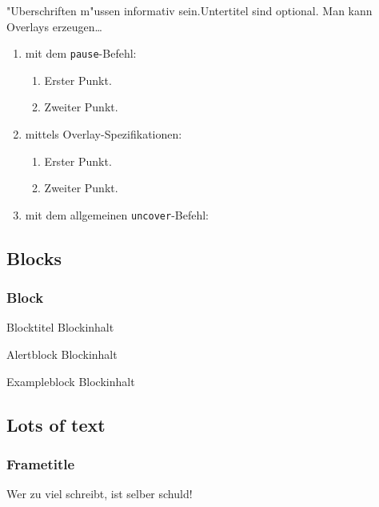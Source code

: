 \documentclass[german,english,mainlanguage=german]{beamer}
\begin{document}
\begin{frame}{"Uberschriften m"ussen informativ sein.}{Untertitel sind optional.}
  Man kann Overlays erzeugen\dots
  \begin{enumerate}
  \item mit dem \texttt{pause}-Befehl:
    \begin{enumerate}
    \item
      Erster Punkt.
      \pause
    \item
      Zweiter Punkt.
    \end{enumerate}
  \item
    mittels Overlay-Spezifikationen:
    \begin{enumerate}
    \item<3->
      Erster Punkt.
    \item<4->
      Zweiter Punkt.
    \end{enumerate}
  \item
    mit dem allgemeinen \texttt{uncover}-Befehl:
    \begin{enumerate}
    \end{enumerate}
  \end{enumerate}
\end{frame}

\subsection{Blocks}
\begin{frame}\frametitle{Block}
\begin{block}{Blocktitel}
Blockinhalt
\end{block}
\begin{alertblock}{Alertblock}
Blockinhalt
\end{alertblock}
\begin{exampleblock}{Exampleblock}
Blockinhalt
\end{exampleblock}
\end{frame}

\subsection{Lots of text}
\begin{frame}\frametitle{Frametitle}
Wer zu viel schreibt, ist selber schuld!

\end{frame}
\end{document}
